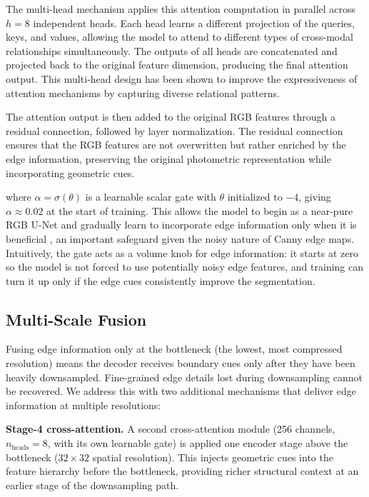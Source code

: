 The multi-head mechanism applies this attention computation in parallel across $h=8$ independent heads. Each head learns a different projection of the queries, keys, and values, allowing the model to attend to different types of cross-modal relationships simultaneously. The outputs of all heads are concatenated and projected back to the original feature dimension, producing the final attention output. This multi-head design has been shown to improve the expressiveness of attention mechanisms by capturing diverse relational patterns.

The attention output is then added to the original RGB features through a residual connection, followed by layer normalization. The residual connection ensures that the RGB features are not overwritten but rather enriched by the edge information, preserving the original photometric representation while incorporating geometric cues.

where $\alpha = \sigma(\theta)$ is a learnable scalar gate with $\theta$ initialized to $-4$, giving $\alpha \approx 0.02$ at the start of training. This allows the model to begin as a near-pure RGB U-Net and gradually learn to incorporate edge information only when it is beneficial ,  an important safeguard given the noisy nature of Canny edge maps. Intuitively, the gate acts as a volume knob for edge information: it starts at zero so the model is not forced to use potentially noisy edge features, and training can turn it up only if the edge cues consistently improve the segmentation.

\subsection{Multi-Scale Fusion}

Fusing edge information only at the bottleneck (the lowest, most compressed resolution) means the decoder receives boundary cues only after they have been heavily downsampled. Fine-grained edge details lost during downsampling cannot be recovered. We address this with two additional mechanisms that deliver edge information at multiple resolutions:

\textbf{Stage-4 cross-attention.} A second cross-attention module (256 channels, $n_\text{heads}=8$, with its own learnable gate) is applied one encoder stage above the bottleneck ($32{\times}32$ spatial resolution). This injects geometric cues into the feature hierarchy before the bottleneck, providing richer structural context at an earlier stage of the downsampling path.

